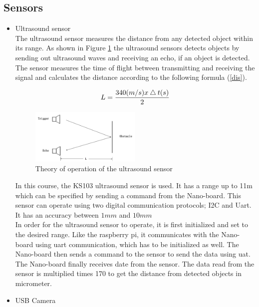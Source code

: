 \documentclass[11pt,twocolumn]{article}
\begin{document}
\subsection{Sensors} 
\begin{itemize}
	\item{Ultrasound sensor} \\
	The ultrasound sensor measures the distance from any detected object within its range. As shown in Figure \ref{ultrasound} the ultrasound sensors detects objects by sending out ultrasound waves and receiving an echo, if an object is detected. The sensor measures the time of flight between transmitting and receiving the signal and calculates the distance according to the following formula (\ref{dis}).
	
\begin{equation}
\centering
L = \frac{340(m/s)x\bigtriangleup t(s)}{2}
\label{dis}
\end{equation}

\begin{figure}[h]
\centering
\includegraphics[width=0.5\textwidth]{ultrasound.png}
\caption{Theory of operation of the ultrasound sensor}
\label{ultrasound}
\end{figure}

In this course, the KS103 ultrasound sensor is used. It has a range up to 11m which can be specified by sending a command from the Nano-board. This sensor can operate using two digital communication protocols; I2C and Uart. It has an accuracy between $1mm$ and $10mm$\\
In order for the ultrasound sensor to operate, it is first initialized and set to the desired range. Like the raspberry pi, it communicates with the Nano-board using uart communication, which has to be initialized as well. The Nano-board then sends a command to the sensor to send the data using uat. The Nano-board finally receives date from the sensor. The data read from the sensor is multiplied times 170 to get the distance from detected objects in micrometer.  
	\item{USB Camera}
\end{itemize}
\end{document}
